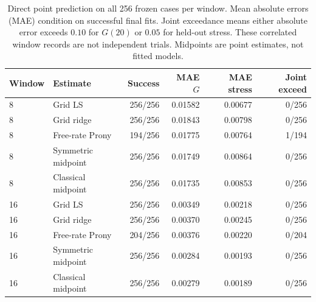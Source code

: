 \begin{table}[ht]
\centering\small
\caption{Direct point prediction on all 256 frozen cases per window. Mean absolute errors (MAE) condition on successful final fits. Joint exceedance means either absolute error exceeds $0.10$ for $G(20)$ or $0.05$ for held-out stress. These correlated window records are not independent trials. Midpoints are point estimates, not fitted models.}
\label{tab:direct-fits}
\begin{tabular}{llrrrr}
\toprule
Window & Estimate & Success & MAE $G$ & MAE stress & Joint exceed\\\midrule
8 & Grid LS & 256/256 & 0.01582 & 0.00677 & 0/256\\
8 & Grid ridge & 256/256 & 0.01843 & 0.00798 & 0/256\\
8 & Free-rate Prony & 194/256 & 0.01775 & 0.00764 & 1/194\\
8 & Symmetric midpoint & 256/256 & 0.01749 & 0.00864 & 0/256\\
8 & Classical midpoint & 256/256 & 0.01735 & 0.00853 & 0/256\\
\midrule
16 & Grid LS & 256/256 & 0.00349 & 0.00218 & 0/256\\
16 & Grid ridge & 256/256 & 0.00370 & 0.00245 & 0/256\\
16 & Free-rate Prony & 204/256 & 0.00376 & 0.00220 & 0/204\\
16 & Symmetric midpoint & 256/256 & 0.00284 & 0.00193 & 0/256\\
16 & Classical midpoint & 256/256 & 0.00279 & 0.00189 & 0/256\\
\bottomrule\end{tabular}
\end{table}
